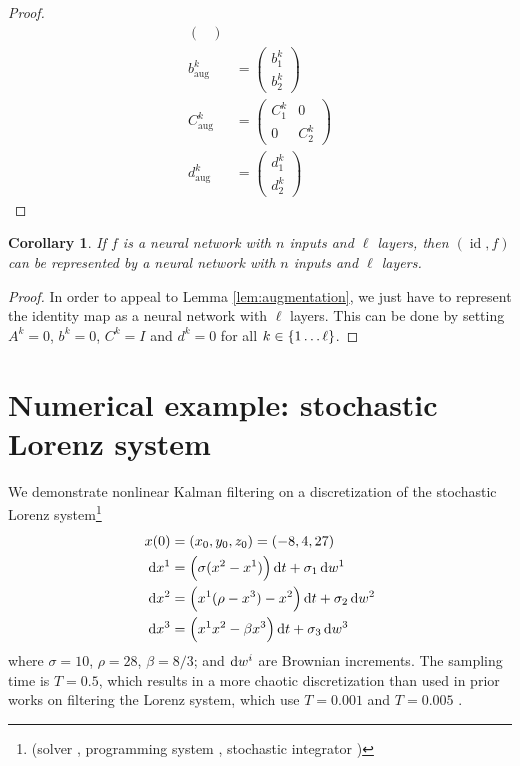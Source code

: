 \documentclass[oneside, article]{memoir}
\newtheorem{corollary}{Corollary}
\begin{document}
\begin{proof}
\begin{align}
\begin{pmatrix}
    \end{pmatrix}
    \\
    b_\text{aug}^k &= \begin{pmatrix}
      b_1^k \\ b_2^k
    \end{pmatrix}
    \\
    C_\text{aug}^k &= \begin{pmatrix}
      C_1^k & 0 \\
      0 & C_2^k
    \end{pmatrix}
    \\
    d_\text{aug}^k &= \begin{pmatrix}
      d_1^k \\ d_2^k
    \end{pmatrix}
  \end{align}
\end{proof}

\begin{corollary}
  If \(f\) is a neural network with \(n\) inputs and \(\ell\) layers,
  then \((\operatorname{id}, f)\) can be represented by a neural network with \(n\)
  inputs and \(\ell\) layers.
\end{corollary}
\begin{proof}
  In order to appeal to Lemma \ref{lem:augmentation}, we just have to represent the identity map as a neural network with \(\ell\) layers.
  This can be done by setting \(A^k = 0\), \(b^k = 0\), \(C^k = I\) and \(d^k = 0\) for all \(k \in \cbr{1 \ldots \ell}\).
\end{proof}


\chapter{Numerical example: stochastic Lorenz system}
We demonstrate nonlinear Kalman filtering on a discretization of the stochastic Lorenz system\footnote{(solver \cite{kidger_neural_2021}, programming system
\cite{kidger_equinox_2021,bradbury_jax_2018}, stochastic integrator
\cite{foster_high_2023})}
\begin{align}
  x(0) &= (x_0, y_0, z_0) = (-8, 4, 27)\\
  \dif{x^1} &= \del{\sigma (x^2 - x^1)} \dif t + \sigma_1 \dif w^1\\
  \dif{x^2} &= \del{x^1(\rho - x^3) - x^2} \dif t + \sigma_2 \dif w^2 \\
  \dif{x^3} &= \del{x^1 x^2 - \beta x^3} \dif t + \sigma_3 \dif w^3
\end{align}
where \(\sigma = 10\), \(\rho = 28\), \(\beta = 8/3\); and \(\dif w^i\) are Brownian increments.
The sampling time is \(T= 0.5\), which results in a more chaotic discretization than used in prior works on filtering the Lorenz system, which use \(T = 0.001\) \cite{nosrati_chaotic_2011} and \(T = 0.005\) \cite{dubois_data-driven_2020}.
\end{document}
